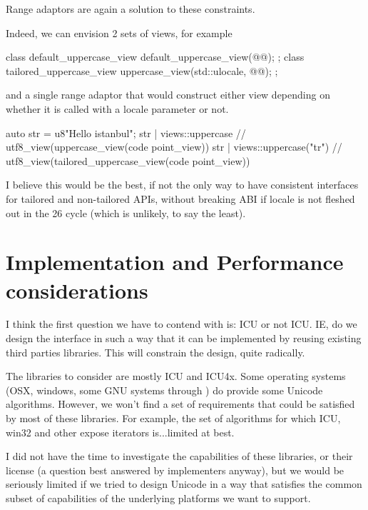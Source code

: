 \documentclass{wg21}
\begin{document}
Range adaptors are again a solution to these constraints.

Indeed, we can envision 2 sets of views, for example

\begin{colorblock}
class default_uppercase_view {
    default_uppercase_view(@@);
};
class tailored_uppercase_view {
    uppercase_view(std::ulocale, @@);
};
\end{colorblock}

and a single range adaptor  that would construct either view depending on whether it is called
with a locale parameter or not.

\begin{colorblock}
auto str = u8"Hello istanbul";
str | views::uppercase // utf8_view(uppercase_view(code point_view))
str | views::uppercase("tr") // utf8_view(tailored_uppercase_view(code point_view))
\end{colorblock}

I believe this would be the best, if not the only way to have consistent interfaces for tailored and non-tailored APIs,
without breaking ABI if locale is not fleshed out in the 26 cycle (which is unlikely, to say the least).

\section{Implementation and Performance considerations}

I think the first question we have to contend with is: ICU or not ICU.
IE, do we design the interface in such a way that it can be implemented by reusing existing third parties libraries.
This will constrain the design, quite radically.

The libraries to consider are mostly ICU and ICU4x. Some operating systems (OSX, windows, some GNU systems through ) do provide some Unicode algorithms.
However, we won't find a set of requirements that could be satisfied by most of these libraries. For example, the set of algorithms for which ICU, win32 and other expose iterators is...limited at best.

I did not have the time to investigate the capabilities of these libraries, or their license (a question best answered by implementers anyway), but we would be seriously limited if we tried to
design Unicode in a way that satisfies the common subset of capabilities of the underlying platforms we want to support.
\end{document}
